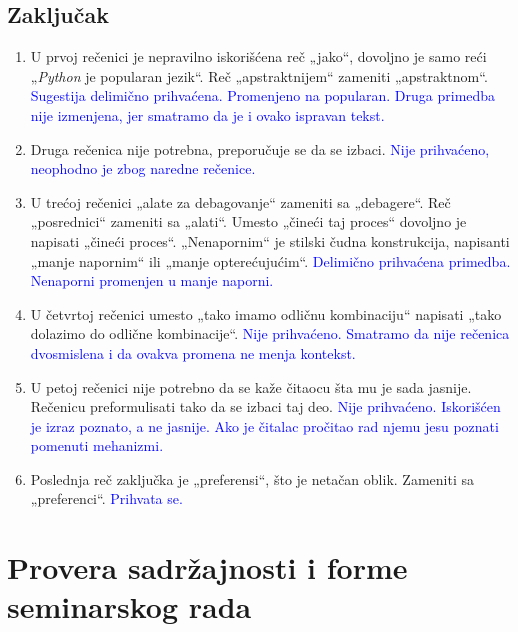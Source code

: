 \documentclass[a4paper]{report}
\newcommand{\odgovor}[1]{\textcolor{blue}{#1}}
\begin{document}
\subsection{Zaključak}
\begin{enumerate}
    \item U prvoj rečenici je nepravilno iskorišćena reč „jako“, dovoljno je samo reći „\emph{Python} je popularan jezik“. Reč „apstraktnijem“ zameniti „apstraktnom“.
    \odgovor{Sugestija delimično prihvaćena. Promenjeno na popularan. Druga primedba nije izmenjena, jer smatramo da je i ovako ispravan tekst.}
    \item Druga rečenica nije potrebna, preporučuje se da se izbaci.
    \odgovor{Nije prihvaćeno, neophodno je zbog naredne rečenice.}
    \item U trećoj rečenici „alate za debagovanje“ zameniti sa „debagere“. Reč „posrednici“ zameniti sa „alati“. Umesto „čineći taj proces“ dovoljno je napisati „čineći proces“. „Nenapornim“ je stilski čudna konstrukcija, napisanti „manje napornim“ ili „manje opterećujućim“.
    \odgovor{Delimično prihvaćena primedba. Nenaporni promenjen u manje naporni.}
    \item U četvrtoj rečenici umesto „tako imamo odličnu kombinaciju“ napisati „tako dolazimo do odlične kombinacije“.
    \odgovor{Nije prihvaćeno. Smatramo da nije rečenica dvosmislena i da ovakva promena ne menja kontekst.}
    \item U petoj rečenici nije potrebno da se kaže čitaocu šta mu je sada jasnije. Rečenicu preformulisati tako da se izbaci taj deo.
    \odgovor{Nije prihvaćeno. Iskorišćen je izraz poznato, a ne jasnije. Ako je čitalac pročitao rad njemu jesu poznati pomenuti mehanizmi.}
    \item Poslednja reč zaključka je „preferensi“, što je netačan oblik. Zameniti sa „preferenci“.
    \odgovor{Prihvata se.}
\end{enumerate}

\section{Provera sadržajnosti i forme seminarskog rada}
\end{document}
